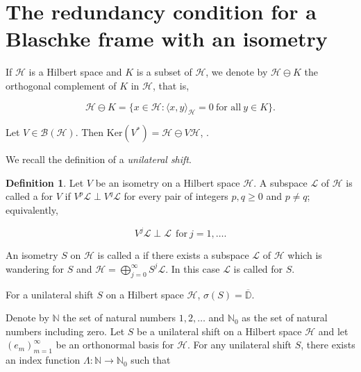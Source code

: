 \documentclass[10pt, reqno]{amsart}
\theoremstyle{definition}
\newtheorem{definition}[theorem]{Definition}
\numberwithin{equation}{section}
\begin{document}

\section{The redundancy condition for a Blaschke frame with an isometry}\label{Blaschkeframes}

If $\mathcal{H}$ is a Hilbert space and $K$ is a subset of $\mathcal{H}$, we denote by $\mathcal{H}\ominus K$ the orthogonal complement of $K$ in $\mathcal{H}$, that is,

$$\mathcal{H}\ominus K=\Big\{x\in\mathcal{H}: \langle x,y\rangle_{\mathcal{H}}=0~\text{for all}~y\in K\Big\}.$$

\noindent Let $V\in\mathcal{B}(\mathcal{H})$. Then $\mathrm{Ker}(V^{*})=\mathcal{H}\ominus V\mathcal{H}$, \cite[Lemma 1]{severino}.

We recall the definition of a {\it{unilateral shift}}.

\begin{definition}{}\label{wanderingsubspace}
    Let $V$ be an isometry on a Hilbert space $\mathcal{H}$. A subspace $\mathcal{L}$ of $\mathcal{H}$ is called a {} for $V$ if $V^{p}\mathcal{L}\perp V^{q}\mathcal{L}$ for every pair of integers $p,q\geq 0$ and $p\neq q$; equivalently, 

    $$V^{j}\mathcal{L}\perp\mathcal{L}~~\text{for}~j=1,\hdots.$$

\noindent An isometry $S$ on $\mathcal{H}$ is called a {} if there exists a subspace $\mathcal{L}$ of $\mathcal{H}$ which is wandering for $S$ and $\mathcal{H}=\bigoplus_{j=0}^{\infty}S^{j}\mathcal{L}$. In this case $\mathcal{L}$ is called {} for $S$.

\end{definition}

\noindent For a unilateral shift $S$ on a Hilbert space $\mathcal{H}$, $\sigma(S)=\overline{\mathbb{D}}$.

Denote by $\mathbb{N}$ the set of natural numbers $1,2,\hdots$ and $\mathbb{N}_{0}$ as the set of natural numbers including zero. Let $S$ be a unilateral shift on a Hilbert space $\mathcal{H}$ and let $(e_{m})_{m=1}^{\infty}$ be an orthonormal basis for $\mathcal{H}$. For any unilateral shift $S$, there exists an index function $\Lambda:\mathbb{N}\rightarrow\mathbb{N}_{0}$ such that
\end{document}

